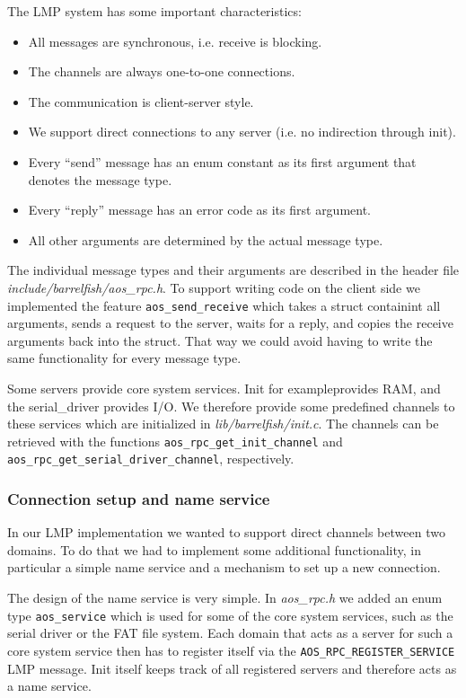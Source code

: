 \documentclass[a4paper,10pt]{article}
\newcommand{\filepath}[1]{\emph{ #1}}
\begin{document}
The LMP system has some important characteristics:
\begin{itemize}
 \item All messages are synchronous, i.e. receive is blocking.
 \item The channels are always one-to-one connections.
 \item The communication is client-server style.
 \item We support direct connections to any server (i.e. no indirection through init).
 \item Every ``send'' message has an enum constant as its first argument that denotes the message type.
 \item Every ``reply'' message has an error code as its first argument.
 \item All other arguments are determined by the actual message type.
\end{itemize}

The individual message types and their arguments are described in the header file \filepath{include/barrelfish/aos\_rpc.h}.
To support writing code on the client side we implemented the feature \lstinline!aos_send_receive! which takes a struct containint all arguments, 
sends a request to the server, waits for a reply, and copies the receive arguments back into the struct.
That way we could avoid having to write the same functionality for every message type.

Some servers provide core system services. Init for exampleprovides RAM, and the serial\_driver provides I/O.
We therefore provide some predefined channels to these services which are initialized in \filepath{lib/barrelfish/init.c}.
The channels can be retrieved with the functions \lstinline!aos_rpc_get_init_channel! and \lstinline!aos_rpc_get_serial_driver_channel!, respectively.

\subsubsection{Connection setup and name service}

In our LMP implementation we wanted to support direct channels between two domains.
To do that we had to implement some additional functionality, in particular a simple name service and a mechanism to set up a new connection.

The design of the name service is very simple.
In \filepath{aos\_rpc.h} we added an enum type \lstinline!aos_service! which is used for some of the core system services, such as the serial driver or the FAT file system.
Each domain that acts as a server for such a core system service then has to register itself via the \lstinline!AOS_RPC_REGISTER_SERVICE! LMP message.
Init itself keeps track of all registered servers and therefore acts as a name service.
\end{document}
